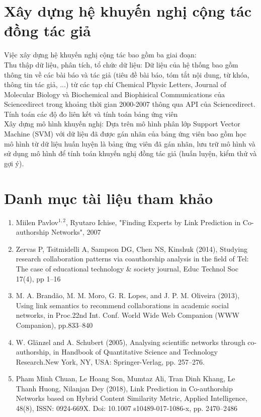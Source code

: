 \documentclass{article}
\begin{document}
\section{Xây dựng hệ khuyến nghị cộng tác đồng tác giả}


Việc xây dựng hệ khuyến nghị cộng tác bao gồm ba giai đoạn: \\

\indent Thu thập dữ liệu, phân tích, tổ chức dữ liệu: Dữ liệu của hệ thống bao gồm thông tin về các bài báo và tác giả (tiêu đề bài báo, tóm tắt nội dung, từ khóa, thông tin tác giả, ...) từ các tạp chí Chemical Physic Letters, Journal of Molecular Biology và Biochemical and Biophisical Communications của Sciencedirect trong khoảng thời gian 2000-2007 thông qua API của Sciencedirect. \\

\indent Tính toán các độ đo liên kết và tính toán bảng ứng viên \\

\indent Xây dựng mô hình khuyến nghị: Dựa trên mô hình phân lớp Support Vector Machine (SVM) với dữ liệu đã được gán nhãn của bảng ứng viên bao gồm học mô hình từ dữ liệu huấn luyện là bảng ứng viên đã gán nhãn, lưu trữ mô hình và sử dụng mô hình để tính toán khuyến nghị đồng tác giả (huấn luyện, kiểm thử và gợi ý).

\newpage

\section{Danh mục tài liệu tham khảo}

\begin{enumerate}
	\item Miilen Pavlov$^{1, 2}$, Ryutaro Ichise, "Finding Experts by Link Prediction in Co-authorship Networks", 2007
	\item Zervas P, Tsitmidelli A, Sampson DG, Chen NS, Kinshuk (2014), Studying research collaboration pat\-terns via co\-authorship analysis in the field of Tel: The case of educational technology \& society journal, Educ Technol Soc 17(4), pp 1–16
	\item  M. A. Brandão, M. M. Moro, G. R. Lopes, and J. P. M. Oliveira (2013), Using link semantics to recommend collaborations in academic social networks, in Proc.22nd Int. Conf. World Wide Web Companion (WWW Companion), pp.833–840
	\item  W. Glänzel and A. Schubert (2005), Analysing scientific networks through co-authorship, in Handbook of Quantitative Science and Technology Research.New York, NY, USA: Springer-Verlag, pp. 257–276.
	\item Pham Minh Chuan, Le Hoang Son, Mumtaz Ali, Tran Dinh Khang, Le Thanh Huong, Nilanjan Dey (2018), Link Prediction in Co-authorship Networks based on Hybrid Content Similarity Metric, Applied Intelligence, 48(8), ISSN: 0924-669X. Doi: 10.1007 s10489-017-1086-x, pp. 2470–2486
\end{enumerate}
\end{document}
